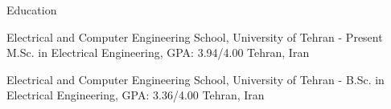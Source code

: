 \documentclass[../professional-cv.tex]{subfiles}
\begin{document}
	\begin{rSection}{ Education }
		
		
		\rSubsectionHeading
		{Electrical and Computer Engineering School, \nem University of Tehran}
		{  - Present }
		{\normalfont M.Sc. in Electrical Engineering, GPA: 3.94/4.00}
		{Tehran, Iran}
	
		\rSubsectionHeading
		{Electrical and Computer Engineering School, \nem University of Tehran}
		{  -  }
		{\normalfont B.Sc. in Electrical Engineering, GPA: 3.36/4.00}
		{Tehran, Iran}
		
		
	\end{rSection}
\end{document}
